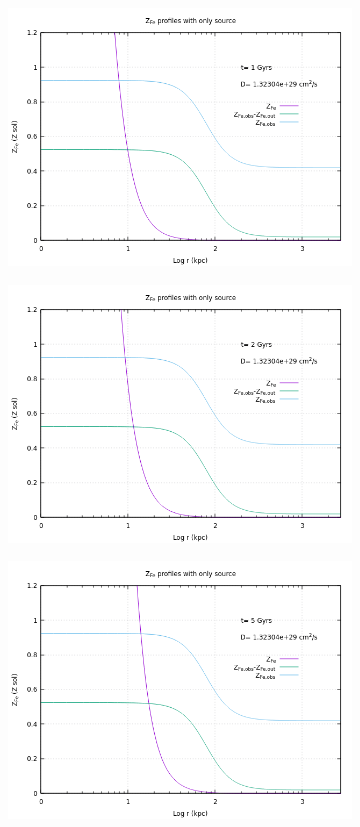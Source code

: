 \documentclass{article}
\begin{document}
\begin{figure}[H]
	\begin{subfigure}{0.50\textwidth}
		\includegraphics[width=0.9\linewidth]{Z_source_1.png}
	\end{subfigure}
	\begin{subfigure}{0.49\textwidth}
		\includegraphics[width=0.9\linewidth]{Z_source_2.png}
	\end{subfigure}
	\begin{subfigure}{0.49\textwidth}
		\includegraphics[width=0.9\linewidth]{Z_source_5.png}
	\end{subfigure}
	\begin{subfigure}{0.49\textwidth}
		

\end{subfigure}
\end{figure}
\end{document}
